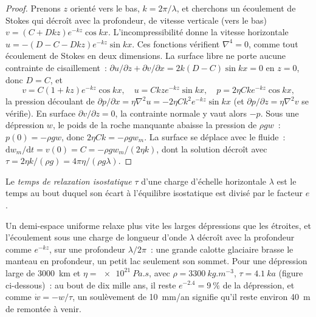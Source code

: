 \begin{proof}
Prenons $z$ orienté vers le bas, $k = 2\pi/\lambda$, et cherchons un écoulement de Stokes qui décroît
avec la profondeur, de vitesse verticale (vers le bas) $v = (C + Dkz)e^{-kz}\cos kx$.
L'incompressibilité donne la vitesse horizontale $u = -(D - C - Dkz)e^{-kz}\sin
kx$. Ces fonctions vérifient $\nabla^4 = 0$, comme tout écoulement de Stokes en deux
dimensions. La surface libre ne porte aucune contrainte de cisaillement~: $\partial u/\partial
z + \partial v/\partial x = 2k(D - C)\sin kx = 0$ en $z = 0$, donc $D = C$, et
\[
  v = C(1 + kz)e^{-kz}\cos kx,\quad u = Ckze^{-kz}\sin kx,\quad
  p = 2\eta Cke^{-kz}\cos kx,
\]
la pression découlant de $\partial p/\partial x = \eta\nabla^2u = -2\eta
Ck^2e^{-kz}\sin kx$ (et $\partial p/\partial z = \eta\nabla^2v$ se vérifie). En
surface $\partial v/\partial z = 0$, la contrainte normale y vaut alors $-p$. Sous
une dépression $w$, le poids de la roche manquante abaisse la pression de $\rho
gw$~: $p(0) = -\rho gw$, donc $2\eta Ck = -\rho gw_m$. La surface se déplace avec le
fluide~: $\mathrm dw_m/\mathrm dt = v(0) = C = -\rho gw_m/(2\eta k)$, dont la
solution décroît avec $\tau = 2\eta k/(\rho g) = 4\pi\eta/(\rho g\lambda)$.
\end{proof}

\begin{definition}\label{def:b3:mantle-convection:relaxation-time}
Le \emph{temps de relaxation isostatique} $\tau$ d'une
charge d'échelle horizontale $\lambda$ est le temps au bout duquel son écart
à l'équilibre isostatique est divisé par le facteur $e$.
\end{definition}

Un demi-espace uniforme relaxe plus vite les larges dépressions que les étroites, et
l'écoulement sous une charge de longueur d'onde $\lambda$ décroît avec la profondeur comme $e^{-kz}$, sur
une profondeur $\lambda/2\pi$~: une grande calotte glaciaire brasse le manteau en profondeur, un petit lac
seulement son sommet. Pour une dépression large de \qty{3000}{km} et $\eta =
\qty{e21}{Pa.s}$, avec $\rho = \qty{3300}{kg.m^{-3}}$, $\tau = \qty{4.1}{ka}$
(figure ci-dessous)~: au bout de dix mille ans, il reste $e^{-2.4} = \qty{9}{\percent}$ de
la dépression, et comme $\dot w = -w/\tau$, un soulèvement de
\qty{10}{mm/an} signifie qu'il reste environ \qty{40}{m} de remontée à venir.

